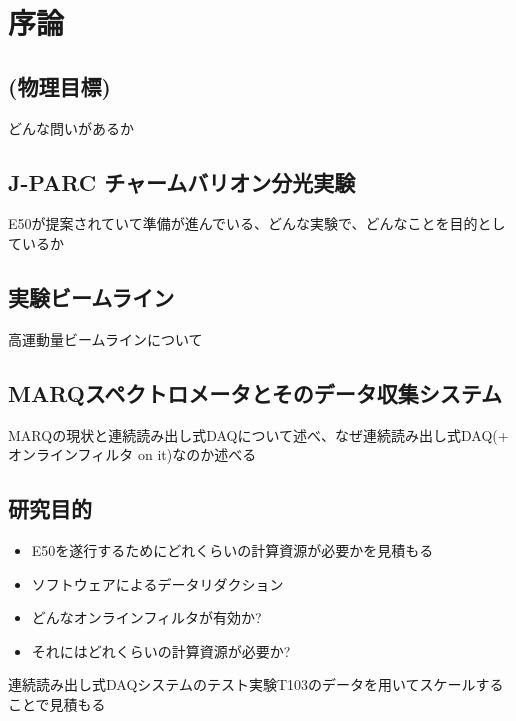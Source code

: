 \documentclass[../main.tex]{subfiles}
\begin{document}
\section{序論}
\label{sec:introduction}
\subsection{(物理目標)}
どんな問いがあるか
\subsection{J-PARC チャームバリオン分光実験}
E50が提案されていて準備が進んでいる、どんな実験で、どんなことを目的としているか
\subsection{実験ビームライン}
高運動量ビームラインについて
\subsection{MARQスペクトロメータとそのデータ収集システム}
MARQの現状と連続読み出し式DAQについて述べ、なぜ連続読み出し式DAQ(+ オンラインフィルタ on it)なのか述べる
\subsection{研究目的}
\begin{itemize}
  \item E50を遂行するためにどれくらいの計算資源が必要かを見積もる
  \item ソフトウェアによるデータリダクション
  \item どんなオンラインフィルタが有効か?
  \item それにはどれくらいの計算資源が必要か?
\end{itemize}


連続読み出し式DAQシステムのテスト実験T103のデータを用いてスケールすることで見積もる
\end{document}
